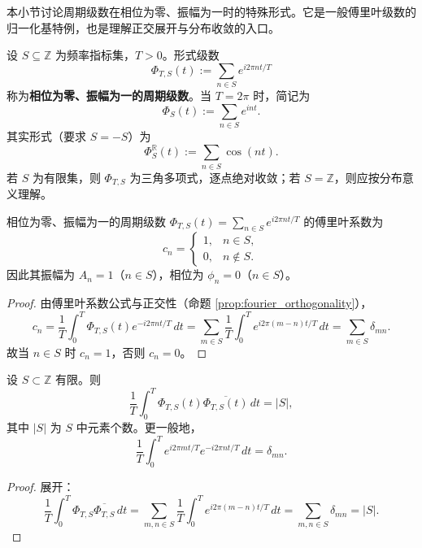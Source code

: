 本小节讨论周期级数在相位为零、振幅为一时的特殊形式。它是一般傅里叶级数的归一化基特例，也是理解正交展开与分布收敛的入口。

\begin{definition}\label{def:unit_phase_zero_amplitude_series}
设 $S \subseteq \mathbb{Z}$ 为频率指标集，$T>0$。形式级数
\[
\Phi_{T,S}(t) := \sum_{n \in S} e^{i 2\pi n t/T}
\]
称为\textbf{相位为零、振幅为一的周期级数}。当 $T=2\pi$ 时，简记为
\[
\Phi_S(t) := \sum_{n \in S} e^{i n t}.
\]
其实形式（要求 $S=-S$）为
\[
\Phi_S^{\mathbb{R}}(t) := \sum_{n \in S} \cos(nt).
\]
若 $S$ 为有限集，则 $\Phi_{T,S}$ 为三角多项式，逐点绝对收敛；若 $S=\mathbb{Z}$，则应按分布意义理解。
\end{definition}

\begin{proposition}[系数、相位与振幅的归一化]\label{prop:unit_phase_zero_coefficients}
相位为零、振幅为一的周期级数 $\Phi_{T,S}(t)=\sum_{n\in S}e^{i2\pi n t/T}$ 的傅里叶系数为
\[
c_n =
\begin{cases}
1, & n\in S,\\
0, & n\notin S.
\end{cases}
\]
因此其振幅为 $A_n=1$（$n\in S$），相位为 $\phi_n=0$（$n\in S$）。
\end{proposition}

\begin{proof}
由傅里叶系数公式与正交性（命题 \ref{prop:fourier_orthogonality}），
\[
c_n=\frac{1}{T}\int_0^T \Phi_{T,S}(t)e^{-i2\pi n t/T}\,dt
=\sum_{m\in S}\frac{1}{T}\int_0^T e^{i2\pi (m-n)t/T}\,dt
=\sum_{m\in S}\delta_{mn}.
\]
故当 $n\in S$ 时 $c_n=1$，否则 $c_n=0$。
\end{proof}

\begin{lemma}\label{lem:unit_phase_zero_orthogonality}
设 $S\subset \mathbb{Z}$ 有限。则
\[
\frac{1}{T}\int_0^T \Phi_{T,S}(t)\overline{\Phi_{T,S}(t)}\,dt = |S|,
\]
其中 $|S|$ 为 $S$ 中元素个数。更一般地，
\[
\frac{1}{T}\int_0^T e^{i2\pi m t/T}e^{-i2\pi n t/T}\,dt=\delta_{mn}.
\]
\end{lemma}

\begin{proof}
展开：
\[
\frac{1}{T}\int_0^T \Phi_{T,S}\overline{\Phi_{T,S}}\,dt
=\sum_{m,n\in S}\frac{1}{T}\int_0^T e^{i2\pi (m-n)t/T}\,dt
=\sum_{m,n\in S}\delta_{mn}=|S|.
\]
\end{proof}

